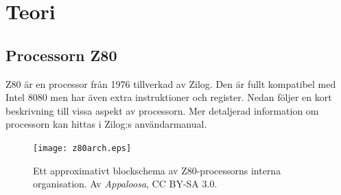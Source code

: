 \documentclass[main.tex]{subfiles}
\begin{document}
\section{Teori}
\subsection{Processorn Z80}
Z80 är en processor från 1976 tillverkad av Zilog. Den är fullt kompatibel med
Intel 8080 men har även extra instruktioner och register. Nedan följer en kort
beskrivning till vissa aspekt av processorn. Mer detaljerad information om
processorn kan hittas i Zilog:s användarmanual.\cite{z80um}

\begin{figure}
    \center
    \texttt{[image: z80arch.eps]}
    \caption{Ett approximativt blockschema av Z80-processorns interna
    organisation. Av {\it Appaloosa}, CC BY-SA 3.0.}
\end{figure}
\end{document}
